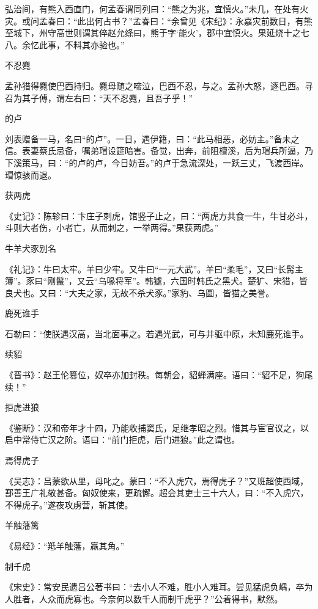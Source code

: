 \documentclass[a4paper,12pt,UTF8,twoside]{ctexbook}
\begin{document}
    弘治间，有熊入西直门，何孟春谓同列曰：“熊之为兆，宜慎火。”未几，在处有火灾。或问孟春曰：“此出何占书？”孟春曰：“余曾见《宋纪》：永嘉灾前数日，有熊至城下，州守高世则谓其倅赵允绦曰，熊于字‘能火’，郡中宜慎火。果延烧十之七八。余忆此事，不料其亦验也。”
    
    不忍麑
    
    孟孙猎得麑使巴西持归。麑母随之啼泣，巴西不忍，与之。孟孙大怒，逐巴西。寻召为其子傅，谓左右曰：“天不忍麑，且吾子乎！”
    
    的卢
    
    刘表赠备一马，名曰“的卢”。一日，遇伊籍，曰：“此马相恶，必妨主。”备未之信。表妻蔡氏忌备，嘱弟瑁设筵暗害。备觉，出奔，前阻檀溪，后为瑁兵所逼，乃下溪策马，曰：“的卢的卢，今日妨吾。”的卢于急流深处，一跃三丈，飞渡西岸。瑁惊骇而退。
    
    获两虎
    
    《史记》：陈轸曰：卞庄子刺虎，馆竖子止之，曰：“两虎方共食一牛，牛甘必斗，斗则大者伤，小者亡，从而刺之，一举两得。”果获两虎。”
    
    牛羊犬豕别名
    
    《礼记》：牛曰太牢。羊曰少牢。又牛曰“一元大武”。羊曰“柔毛”，又曰“长髯主簿”。豕曰“刚鬣”，又云“乌喙将军”。韩獹，六国时韩氏之黑犬。楚犷、宋猎，皆良犬也。又曰：“大夫之家，无故不杀犬豕。”家豹、乌圆，皆猫之美誉。
    
    鹿死谁手
    
    石勒曰：“使朕遇汉高，当北面事之。若遇光武，可与并驱中原，未知鹿死谁手。
    
    续貂
    
    《晋书》：赵王伦篡位，奴卒亦加封秩。每朝会，貂蝉满座。语曰：“貂不足，狗尾续！”
    
    拒虎进狼
    
    《鉴断》：汉和帝年才十四，乃能收捕窦氏，足继孝昭之烈。惜其与宦官议之，以启中常侍亡汉之阶。语曰：“前门拒虎，后门进狼。”此之谓也。
    
    焉得虎子
    
    《吴志》：吕蒙欲从里，母叱之。蒙曰：“不入虎穴，焉得虎子？”又班超使西域，鄯善王广礼敬甚备。匈奴使来，更疏懈。超会其吏士三十六人，曰：“不入虎穴，不得虎子。”遂夜攻虏营，斩其使。
    
    羊触藩篱
    
    《易经》：“羝羊触藩，羸其角。”
    
    制千虎
    
    《宋史》：常安民遗吕公著书曰：“去小人不难，胜小人难耳。尝见猛虎负嵎，卒为人胜者，人众而虎寡也。今奈何以数千人而制千虎乎？”公着得书，默然。
    
\end{document}
